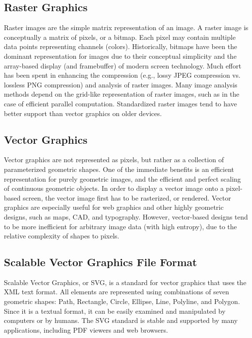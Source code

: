 \subsection{Raster Graphics}

Raster images are the simple matrix representation of an image. A raster image is conceptually a matrix of pixels, or a bitmap. Each pixel may contain multiple data points representing channels (colors). Historically, bitmaps have been the dominant representation for images due to their conceptual simplicity and the array-based display (and framebuffer) of modern screen technology. Much effort has been spent in enhancing the compression (e.g., lossy JPEG compression vs. lossless PNG compression) and analysis of raster images. Many image analysis methods depend on the grid-like representation of raster images, such as in the case of efficient parallel computation. Standardized raster images tend to have better support than vector graphics on older devices.

\subsection{Vector Graphics}

Vector graphics are not represented as pixels, but rather as a collection of parameterized geometric shapes. One of the immediate benefits is an efficient representation for purely geometric images, and the efficient and perfect scaling of continuous geometric objects. In order to display a vector image onto a pixel-based screen, the vector image first has to be rasterized, or rendered. Vector graphics are especially useful for web graphics and other highly geometric designs, such as maps, CAD, and typography. However, vector-based designs tend to be more inefficient for arbitrary image data (with high entropy), due to the relative complexity of shapes to pixels.

\subsection{Scalable Vector Graphics File Format}

Scalable Vector Graphics, or SVG, is a standard for vector graphics that uses the XML text format. All elements are represented using combinations of seven geometric shapes: Path, Rectangle, Circle, Ellipse, Line, Polyline, and Polygon. Since it is a textual format, it can be easily examined and manipulated by computers or by humans. The SVG standard is stable and supported by many applications, including PDF viewers and web browsers.

